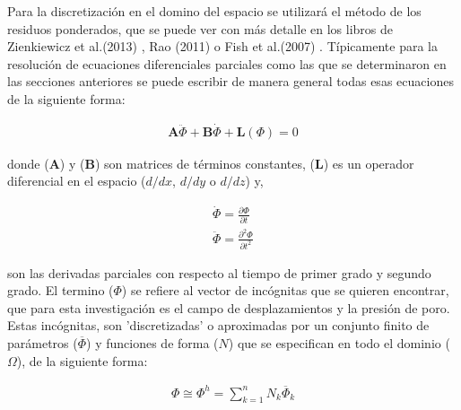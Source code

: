 Para la discretización en el domino del espacio se utilizará el método de los residuos ponderados, que se puede ver con más detalle en los libros de Zienkiewicz et al.(2013) \cite{Zienkiewicz2013TheFundamentals}, Rao (2011) \cite{Rao2011TheEngineering} o Fish et al.(2007) \cite{Fish2007AElements}. Típicamente para la resolución de ecuaciones diferenciales parciales como las que se determinaron en las secciones anteriores se puede escribir de manera general todas esas ecuaciones de la siguiente forma:

\begin{ceqn} %
\begin{gather}\label{eq:equ347}
\mathbf{A}\ddot{\Phi} + \mathbf{B}\dot{\Phi} + \mathbf{L}(\Phi) = 0
\end{gather}   
\end{ceqn}

donde ($\mathbf{A}$) y ($\mathbf{B}$) son matrices de términos constantes, ($\mathbf{L}$) es un operador diferencial en el espacio ($d/dx$, $d/dy$ o $d/dz$) y,

\begin{ceqn} 
\begin{subequations} \label{eq:equ348} 
\begin{gather}
\dot{\Phi}  = \frac{\partial \Phi}{\partial t} \label{eq:equ348a}\\[12pt]
\ddot{\Phi}  = \frac{\partial^2 \Phi}{\partial t^2}  \label{eq:equ348b}
\end{gather}  
\end{subequations} 
\end{ceqn}

son las derivadas parciales con respecto al tiempo de primer grado y segundo grado. El termino ($\Phi$) se refiere al vector de incógnitas que se quieren encontrar, que para esta investigación es el campo de desplazamientos y la presión de poro. Estas incógnitas, son 'discretizadas' o aproximadas por un conjunto finito de parámetros ($\overline{\Phi}$) y funciones de forma ($N$) que se especifican en todo el dominio ($\Omega$), de la siguiente forma:

\begin{ceqn} %
\begin{gather}\label{eq:equ349}
\Phi \cong \Phi^h = \displaystyle\sum_{k=1}^{n} N_k\overline{\Phi}_k
\end{gather}   
\end{ceqn}

